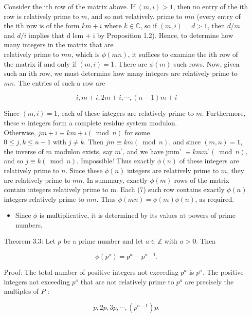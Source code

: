 \documentclass[10pt]{article}
\begin{document}
Consider the ith row of the matrix above. If $(m, i)>1$, then no entry of the ith row is relatively prime to $m$, and so not velatively. prime to $m n$ (every entry of the ith row is of the form $k m+i$ where $k \in \mathbb{C}$, so if $(m, i)=d>1$, then $d / m$ and $d / i$ implies that d lem + i by Proposition 1.2). Hence, to determine how many integers in the matrix that are\\
relatively prime to $m n$, which is $\phi(m n)$, it suffices to examine the ith row of the matrix if and only if $(m, i)=1$. There are $\phi(m)$ such rows. Now, given such an ith row, we must determine how many integers are relatively prime to $m n$. The entries of such a row are

$$
i, m+i, 2 m+i, \cdots,(n-1) m+i
$$

Since $(m, i)=1$, each of these integers are relatively prime to $m$. Furthermore, these $n$ integers form a complete residue system modulon.\\
Otherwise, $j m+i \equiv k m+i(\bmod n)$ for some\\
$0 \leq j, k \leq n-1$ with $j \neq k$. Then $j m \equiv k m(\bmod n)$, and since $(m, n)=1$, the inverse of $m$ modulon exists, say $m^{\prime}$, and we have jmm' $\equiv k m m^{\prime}(\bmod n)$, and so $j \equiv k(\bmod n)$. Impossible! Thus exactly $\phi(n)$ of these integers are relatively prime to $n$. Since these $\phi(n)$ integers are relatively prime to $m$, they are relatively prime to $m n$. In summary, exactly $\phi(m)$ rows of the matrix\\
contain integers relatively prime to m. Each (7) such row contains exactly $\phi(n)$ integers relatively prime to $m n$. Thus $\phi(m n)=\phi(m) \phi(n)$, as required.

\begin{itemize}
  \item Since $\phi$ is multiplicative, it is determined by its values at powers of prime numbers.
\end{itemize}

Theorem 3.3: Let $p$ be a prime number and let $a \in \mathbb{Z}$ with $a>0$. Then

$$
\phi\left(p^{a}\right)=p^{a}-p^{a-1} .
$$

Proof: The total number of positive integers not exceeding $p^{a}$ is $p^{a}$. The positive integers not exceeding $p^{a}$ that are not relatively prime to $p^{a}$ are precisely the multiples of $P$ :

$$
p, 2 p, 3 p, \cdots,\left(p^{a-1}\right) p .
$$
\end{document}
